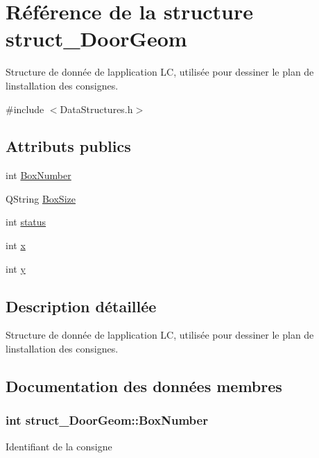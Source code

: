\hypertarget{structstruct___door_geom}{}\section{Référence de la structure struct\+\_\+\+Door\+Geom}
\label{structstruct___door_geom}


Structure de donnée de l\textquotesingle{}application L\+C, utilisée pour dessiner le plan de l\textquotesingle{}installation des consignes.  




{\ttfamily \#include $<$Data\+Structures.\+h$>$}

\subsection*{Attributs publics}
\begin{DoxyCompactItemize}
\item 
int \hyperlink{structstruct___door_geom_ae476f6d2880c35f8b7d265b2d27c3ecd}{Box\+Number}
\item 
Q\+String \hyperlink{structstruct___door_geom_a21703f69a6665c22f39a0345945ccf4f}{Box\+Size}
\item 
int \hyperlink{structstruct___door_geom_a3c54841ea5b7833ed2fe9d1627e87b42}{status}
\item 
int \hyperlink{structstruct___door_geom_ae433a4aa4e4d1949268f5ef7aa84e167}{x}
\item 
int \hyperlink{structstruct___door_geom_acb67782bde0a0ef062f42df2dda50f78}{y}
\end{DoxyCompactItemize}


\subsection{Description détaillée}
Structure de donnée de l\textquotesingle{}application L\+C, utilisée pour dessiner le plan de l\textquotesingle{}installation des consignes. 

\subsection{Documentation des données membres}
\hypertarget{structstruct___door_geom_ae476f6d2880c35f8b7d265b2d27c3ecd}{}
\subsubsection[{Box\+Number}]{\setlength{\rightskip}{0pt plus 5cm}int struct\+\_\+\+Door\+Geom\+::\+Box\+Number}\label{structstruct___door_geom_ae476f6d2880c35f8b7d265b2d27c3ecd}
Identifiant de la consigne \hypertarget{structstruct___door_geom_a21703f69a6665c22f39a0345945ccf4f}{}
